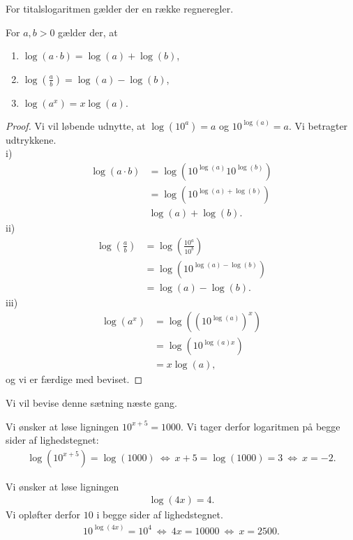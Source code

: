For titalslogaritmen gælder der en række regneregler. 
\begin{setn}[Logaritmeregneregler]
	For $a,b>0$ gælder der, at
	\begin{enumerate}[label=\roman*)]
		\item $\log(a\cdot b) = \log(a)+ \log(b)$,
		\item $\log\left(\frac{a}{b}\right) = \log(a)-\log(b)$,
		\item $\log(a^x) = x\log(a).$
	\end{enumerate}		
\end{setn}
\begin{proof}
	Vi vil løbende udnytte, at $\log(10^a) = a$ og $10^{\log(a)} = a$. Vi betragter udtrykkene.
	\\
	i)
	\begin{align*}
		\log(a\cdot b) &= \log(10^{\log(a)}10^{\log(b)}) \\
		&= \log(10^{\log(a)+\log(b)})\\
		&\log(a) + \log(b).
	\end{align*}
	ii)
	\begin{align*}
		\log\left(\frac{a}{b}\right) &= \log\left(\frac{10^a}{10^b}\right)\\
		&= \log(10^{\log(a)-\log(b)})\\
		&= \log(a)-\log(b).
	\end{align*}
	iii)
	\begin{align*}
		\log(a^x) &= \log\left( \left(10^{\log(a)}\right)^x\right)\\
		&= \log\left(10^{\log(a)x}\right)\\
		&= x\log(a),
    \end{align*}		
    og vi er færdige med beviset. 
\end{proof}
Vi vil bevise denne sætning næste gang. 

\begin{exa}
	Vi ønsker at løse ligningen $10^{x+5} = 1000$. Vi tager derfor logaritmen på begge sider af lighedstegnet:
	\begin{align*}
		\log\left(10^{x+5}\right) = \log(1000) \ \Leftrightarrow \ x+5 = \log(1000) = 3 \ \Leftrightarrow	\ x = -2.
	\end{align*}	 
\end{exa}
\begin{exa}
	Vi ønsker at løse ligningen 
	\begin{align*}
		\log(4x) = 4. 
	\end{align*}
	Vi opløfter derfor $10$ i begge sider af lighedstegnet.
	\begin{align*}
		10^{\log(4x)} = 10^4 \ \Leftrightarrow \ 4x = 10000 \ \Leftrightarrow	\ x = 2500.
	\end{align*}
\end{exa}



